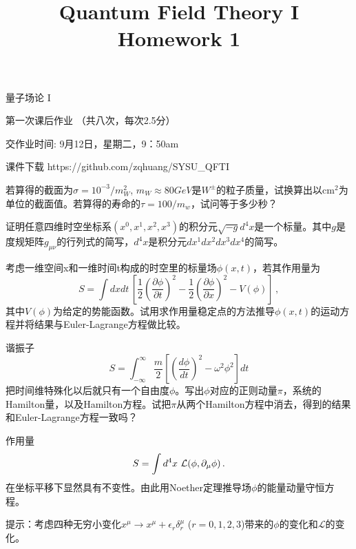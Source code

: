 \documentclass[CJK]{beamer}
\title{Quantum Field Theory I \\ Homework 1}
\author{}
\date{}
\begin{document}
\begin{frame}
 
\begin{center}
\begin{Large}
\bch
量子场论 I 

{\vskip 0.3in}

第一次课后作业 （共八次，每次2.5分）

交作业时间: 9月12日，星期二，9：50am

\ech
\end{Large}
\end{center}

\vskip 0.2in

\bch
课件下载
\ech
https://github.com/zqhuang/SYSU\_QFTI

\end{frame}

\begin{frame}
\bch
若算得的截面为$\sigma = 10^{-3}/m_W^2$, $m_W \approx 80 GeV$是$W^{\pm}$的粒子质量，试换算出以$\mathrm{cm}^2$为单位的截面值。若算得的寿命的$\tau = 100/m_w$，试问等于多少秒？
\ech
\end{frame}



\begin{frame}
\bch
证明任意四维时空坐标系$(x^0, x^1, x^2, x^3)$的积分元$\sqrt{-g}d^4x$是一个标量。其中$g$是度规矩阵$g_{\mu\nu}$的行列式的简写，$d^4x$是积分元$dx^1dx^2dx^3dx^4$的简写。
\ech
\end{frame}


\begin{frame}
\bch
考虑一维空间x和一维时间t构成的时空里的标量场$\phi(x,t)$，若其作用量为
$$ S = \int dx dt \,   \left[ \frac{1}{2}\left(\frac{\partial \phi}{\partial t}\right)^2 -  \frac{1}{2}\left(\frac{\partial \phi}{\partial x}\right)^2 - V(\phi)\right]\, ,$$
其中$V(\phi)$为给定的势能函数。试用求作用量稳定点的方法推导$\phi(x, t)$的运动方程并将结果与Euler-Lagrange方程做比较。
\ech
\end{frame}

\begin{frame}
\bch
谐振子
$$ S = \int_{-\infty}^\infty \frac{m}{2}\left[(\frac{d\phi}{dt})^2 - \omega^2\phi^2\right] dt$$
把时间维特殊化以后就只有一个自由度$\phi$。写出$\phi$对应的正则动量$\pi$，系统的Hamilton量，以及Hamilton方程。试把$\pi$从两个Hamilton方程中消去，得到的结果和Euler-Lagrange方程一致吗？
\ech
\end{frame}


\begin{frame}
\bch
作用量
$$S = \int d^4x\ {\mathcal{L}}(\phi, \partial_\mu\phi)\,.$$
在坐标平移下显然具有不变性。由此用Noether定理推导场$\phi$的能量动量守恒方程。

\skipline

提示：考虑四种无穷小变化$x^\mu \rightarrow x^\mu + \epsilon_r \delta_r^\mu$ ($r = 0, 1, 2, 3$)带来的$\phi$的变化和$\mathcal{L}$的变化。
\ech
\end{frame}
\end{document}
